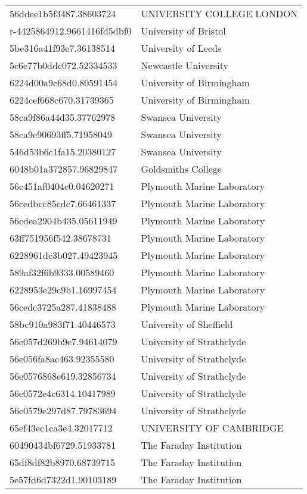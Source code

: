 \begin{tabular}{ll}
56ddee1b5f3487.38603724 & UNIVERSITY COLLEGE LONDON \\
r-4425864912.9661416fd5dbf0 & University of Bristol \\
5be316a41f93e7.36138514 & University of Leeds \\
5c6e77b0ddc072.52334533 & Newcastle University \\
6224d00a9c68d0.80591454 & University of Birmingham \\
6224cef668c670.31739365 & University of Birmingham \\
58ca9f86a44d35.37762978 & Swansea University \\
58ca9e90693ff5.71958049 & Swansea University \\
546d53b6c1fa15.20380127 & Swansea University \\
6048b01a372857.96829847 & Goldsmiths College \\
56c451af0404c0.04620271 & Plymouth Marine Laboratory \\
56cedbcc85cdc7.66461337 & Plymouth Marine Laboratory \\
56cdea2904b435.05611949 & Plymouth Marine Laboratory \\
63ff751956f542.38678731 & Plymouth Marine Laboratory \\
6228961dc3b027.49423945 & Plymouth Marine Laboratory \\
589af32f6b9333.00589460 & Plymouth Marine Laboratory \\
6228953e29c9b1.16997454 & Plymouth Marine Laboratory \\
56cedc3725a287.41838488 & Plymouth Marine Laboratory \\
58bc910a983f71.40446573 & University of Sheffield \\
56e057d269b9e7.94614079 & University of Strathclyde \\
56e056fa8ac463.92355580 & University of Strathclyde \\
56e0576868e619.32856734 & University of Strathclyde \\
56e0572e4c6314.10417989 & University of Strathclyde \\
56e0579e297d87.79783694 & University of Strathclyde \\
65ef43ec1ca3e4.32017712 & UNIVERSITY OF CAMBRIDGE \\
60490434bf6729.51933781 & The Faraday Institution \\
65df8df82b8970.68739715 & The Faraday Institution \\
5e57fd6d7322d1.90103189 & The Faraday Institution \\

\end{tabular}
